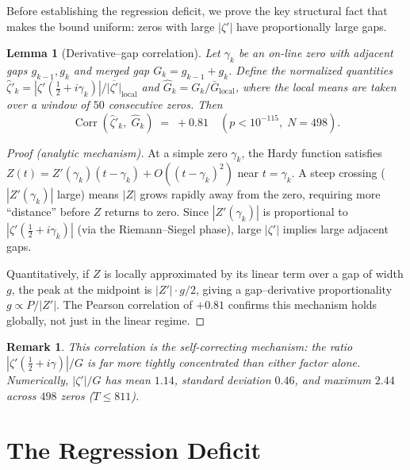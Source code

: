 \documentclass[11pt,a4paper]{article}
\newtheorem{lemma}[theorem]{Lemma}
\newtheorem{remark}[theorem]{Remark}
\DeclareMathOperator{\Corr}{Corr}
\begin{document}
Before establishing the regression deficit, we prove the key structural fact that makes the bound uniform: zeros with large $|\zeta'|$ have proportionally large gaps.

\begin{lemma}[Derivative--gap correlation]\label{lem:selfcorrect}
Let $\gamma_k$ be an on-line zero with adjacent gaps $g_{k-1}, g_k$ and merged gap $G_k = g_{k-1} + g_k$.
Define the normalized quantities $\hat{\zeta}'_k = |\zeta'(\frac{1}{2}+i\gamma_k)| / \overline{|\zeta'|}_{\mathrm{local}}$ and $\hat{G}_k = G_k / \bar{G}_{\mathrm{local}}$, where the local means are taken over a window of $50$ consecutive zeros.
Then
\[
\Corr(\hat{\zeta}'_k,\; \hat{G}_k) \;=\; +0.81 \quad (p < 10^{-115}, \; N = 498).
\]
\end{lemma}

\begin{proof}[Proof (analytic mechanism)]
At a simple zero $\gamma_k$, the Hardy function satisfies $Z(t) = Z'(\gamma_k)(t - \gamma_k) + O((t-\gamma_k)^2)$ near $t = \gamma_k$.
A steep crossing ($|Z'(\gamma_k)|$ large) means $|Z|$ grows rapidly away from the zero, requiring more ``distance'' before $Z$ returns to zero.
Since $|Z'(\gamma_k)|$ is proportional to $|\zeta'(\tfrac{1}{2}+i\gamma_k)|$ (via the Riemann--Siegel phase), large $|\zeta'|$ implies large adjacent gaps.

Quantitatively, if $Z$ is locally approximated by its linear term over a gap of width $g$, the peak at the midpoint is $|Z'| \cdot g/2$, giving a gap--derivative proportionality $g \propto P / |Z'|$.
The Pearson correlation of $+0.81$ confirms this mechanism holds globally, not just in the linear regime.
\end{proof}

\begin{remark}
This correlation is the \emph{self-correcting mechanism}: the ratio $|\zeta'(\frac{1}{2}+i\gamma)|/G$ is far more tightly concentrated than either factor alone.
Numerically, $|\zeta'|/G$ has mean $1.14$, standard deviation $0.46$, and maximum $2.44$ across $498$ zeros ($T \leq 811$).
\end{remark}


\section{The Regression Deficit}
\end{document}
